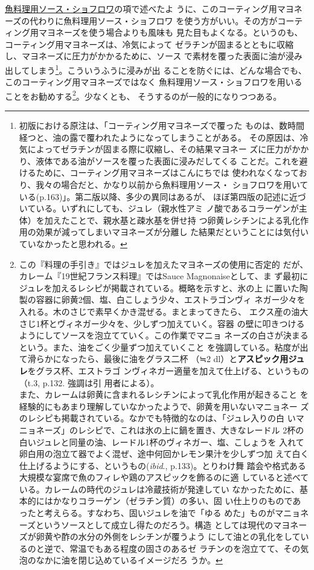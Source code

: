 \begin{recette}
\protect\hyperlink{sauce-chaud-froid-maigre}{魚料理用ソース・ショフロワ}の項で述べたよ
うに、このコーティング用マヨネーズの代わりに魚料理用ソース・ショフロワ
を使う方がいい。その方がコーティング用マヨネーズを使う場合よりも風味も
見た目もよくなる。というのも、コーティング用マヨネーズは、冷気によって
ゼラチンが固まるとともに収縮し、マヨネーズに圧力がかかるために、ソース
で素材を覆った表面に油が浸み出してしまう\footnote{初版における原注は、「コーティング用マヨネーズで覆った
  ものは、数時間経つと、油の露で覆われたようになってしまうことがある。
  その原因は、冷気によってゼラチンが固まる際に収縮し、その結果マヨネー
  ズに圧力がかかり、液体である油がソースを覆った表面に浸みだしてくる
  ことだ。これを避けるために、コーティング用マヨネーズはこんにちでは
  使われなくなっており、我々の場合だと、かなり以前から魚料理用ソース・
  ショフロワを用いている(p.163)」。第二版以降、多少の異同はあるが、
  ほぼ第四版の記述に近づいている。いずれにしても、ジュレ（親水性アミ
  ノ酸であるコラーゲンが主体）を加えたことで、親水基と疎水基を併せ持
  つ卵黄レシチンによる乳化作用の効果が減ってしまいマヨネーズが分離し
  た結果だということには気付いていなかったと思われる。}。こういうふうに浸みが出
ることを防ぐには、どんな場合でも、このコーティング用マヨネーズではなく
魚料理用ソース・ショフロワを用いることをお勧めする\footnote{この『料理の手引き』ではジュレを加えたマヨネーズの使用に否定的
  だが、カレーム『19世紀フランス料理』ではSauce Magnonaiseとして、ま
  ず最初にジュレを加えるレシピが掲載されている。概略を示すと、氷の上
  に置いた陶製の容器に卵黄2個、塩、白こしょう少々、エストラゴンヴィ
  ネガー少々を入れる。木のさじで素早くかき混ぜる。まとまってきたら、
  エクス産の油大さじ1杯とヴィネガー少々を、少しずつ加えていく。容器
  の壁に叩きつけるようにしてソースを泡立てていく。この作業でマニョ
  ネーズの白さが決まるという。また、油をごく少量ずつ加えていくこと
  を強調している。粘度が出て滑らかになったら、最後に油をグラス二杯 （≒2
  dl）と\textbf{アスピック用ジュレ}をグラス\undemi{}杯、エストラゴ
  ンヴィネガー適量を加えて仕上げる、というもの（t.3, p.132. 強調は引
  用者による）。\\
  また、カレームは卵黄に含まれるレシチンによって乳化作用が起きること
  を経験的にもあまり理解していなかったようで、卵黄を用いないマニョネー
  ズのレシピも掲載されている。なかでも特徴的なのは、「ジュレ入りの白
  いマニョネーズ」のレシピで、これは氷の上に鍋を置き、大きなレードル
  2杯の白いジュレと同量の油、レードル1杯のヴィネガー、塩、こしょうを
  入れて卵白用の泡立て器でよく混ぜ、途中何回かレモン果汁を少しずつ加
  えて白く仕上げるようにする、というもの(\emph{ibid}.,
  p.133)。とりわけ舞
  踏会や格式ある大規模な宴席で魚のフィレや鶏のアスピックを飾るのに適
  していると述べている。カレームの時代のジュレは冷蔵技術が発達してい
  なかったために、基本的にはかなりコラーゲン（ゼラチン質）の多い、固
  い仕上りのものであったと考えらる。すなわち、固いジュレを油で「ゆる
  めた」ものがマニョネーズというソースとして成立し得たのだろう。構造
  としては現代のマヨネーズが卵黄や酢の水分の外側をレシチンが覆うよう
  にして油との乳化をしているのと逆で、常温でもある程度の固さのあるゼ
  ラチンのを泡立てて、その気泡のなかに油を閉じ込めているイメージだろ
  うか。}。少なくとも、 そうするのが一般的になりつつある。


\end{recette}
